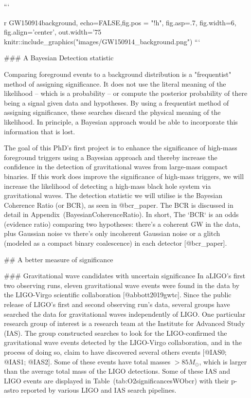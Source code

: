 {```{r GW150914background, echo=FALSE,fig.pos = "!h", fig.asp=.7, fig.width=6, fig.align='center',  out.width='75%
knitr::include_graphics("images/GW150914_background.png")
```

### A Bayesian Detection statistic

Comparing foreground events to a background distribution is a "frequentist" method of assigning significance. It does
not use the literal meaning of the likelihood -- which is a probability -- or compute the posterior probability of there
being a signal given data and hypotheses. By using a frequentist method of assigning significance, these searches
discard the physical meaning of the likelihood. In principle, a Bayesian approach would be able to incorporate this
information that is lost.

The goal of this PhD's first project is to enhance the significance of high-mass foreground triggers using a Bayesian
approach and thereby increase the confidence in the detection of gravitational waves from large-mass compact binaries.
If this work does improve the significance of high-mass triggers, we will increase the likelihood of detecting a
high-mass black hole system via gravitational waves. The detection statistic we will utilise is the Bayesian Coherence
Ratio (or BCR), as seen in @bcr_paper. The BCR is discussed in detail in Appendix~\@ref(BayesianCoherenceRatio). In
short, The `BCR` is an odds (evidence ratio) comparing two hypotheses: there's a coherent GW in the data, plus Gaussian
noise vs there's only incoherent Gaussian noise or a glitch (modeled as a compact binary coalescence) in each detector
[@bcr_paper].




## A better measure of significance

### Gravitational wave candidates with uncertain significance
In aLIGO's first two observing runs, eleven gravitational wave events were found in the data by the LIGO-Virgo
scientific collaboration [@abbott2019gwtc]. Since the public release of LIGO's first and second observing run's data,
several groups have searched the data for gravitational waves independently of LIGO. One particular research group of
interest is a research team at the Institute for Advanced Study (IAS). The group constructed searches to look for the
LIGO-confirmed the gravitational wave events detected by the LIGO-Virgo collaboration, and in the process of doing so,
claim to have discovered several others events [@IAS0; @IAS1; @IAS2]. Some of these events have total masses $>85
M_{\odot}$, which is larger than the average total mass of the LIGO detections. Some of these IAS and LIGO events are
displayed in Table~\@ref(tab:O2significancesWObcr) with their p-astro reported by various LIGO and IAS search pipelines.

}}
